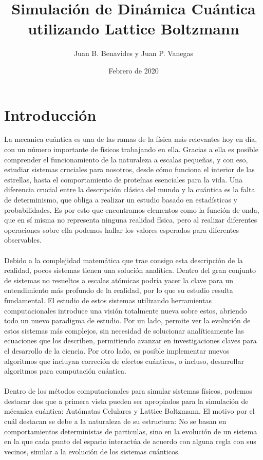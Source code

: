 \documentclass[12pts, letterpaper]{article}
\title{Simulación de Dinámica Cuántica utilizando Lattice Boltzmann}
\author{Juan B. Benavides y Juan P. Vanegas}
\date{Febrero de 2020}
\begin{document}
\maketitle
\section{Introducción}
La mecanica cuántica es una de las ramas de la física más relevantes hoy en día, con un 
número importante de físicos trabajando en ella. Gracias a ella es posible 
comprender el funcionamiento de la naturaleza a escalas pequeñas, y con eso, estudiar 
sistemas cruciales para nosotros, desde cómo funciona el interior de las estrellas, hasta 
el comportamiento de proteínas esenciales para la vida. Una diferencia crucial entre la 
descripción clásica del mundo y la cuántica es la falta de determinismo, que obliga a 
realizar un estudio basado en estadísticas y probabilidades. Es por esto que encontramos 
elementos como la función de onda, que en sí misma no representa ninguna realidad física, 
pero al realizar diferentes operaciones sobre ella podemos hallar los valores esperados 
para diferentes observables.
\\ \\
Debido a la complejidad matemática que trae consigo esta descripción de la realidad, pocos 
sistemas tienen una solución analítica. Dentro del gran conjunto de sistemas no resueltos 
a escalas atómicas podría yacer la clave para un entendimiento más profundo de la realidad,
por lo que su estudio resulta fundamental. El estudio de estos sistemas utilizando 
herramientas computacionales introduce una visión totalmente nueva sobre estos, abriendo 
todo un nuevo paradigma de estudio. Por un lado, permite ver la evolución de estos 
sistemas más complejos, sin necesidad de solucionar analíticamente las ecuaciones que los 
describen, permitiendo avanzar en investigaciones claves para el desarrollo de la ciencia. 
Por otro lado, es posible implementar nuevos algoritmos que incluyan correción de efectos 
cuánticos, o incluso, desarrollar algoritmos para computación cuántica.
\\ \\
Dentro de los métodos computacionales para simular sistemas físicos, podemos destacar dos 
que a primera vista pueden ser apropiados para la simulación de mécanica cuántica: 
Autómatas Celulares y Lattice Boltzmann. El motivo por el cuál destacan se debe a la 
naturaleza de su estructura: No se basan en comportamientos deterministas de particulas, 
sino en la evolución de un sistema en la que cada punto del espacio interactúa de acuerdo 
con alguna regla con sus vecinos, similar a la evolución de los sistemas cuánticos.
\end{document}
